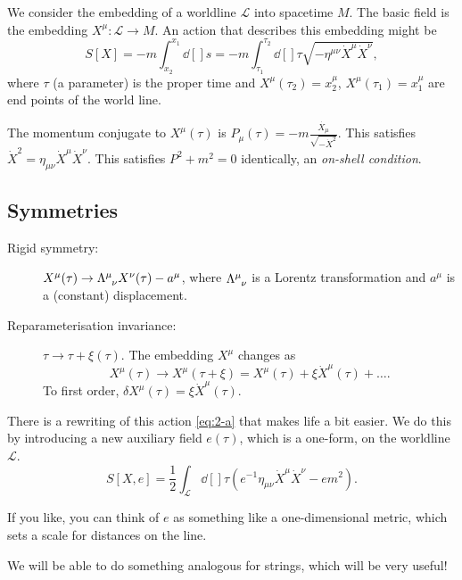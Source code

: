 We consider the embedding of a worldline $\mathcal{L}$  into spacetime $M$.
The basic field is the embedding  $X^{\mu} \colon \mathcal{L} \to M$. An action that describes this embedding might be
\begin{equation}
  \label{eq:2-a}
  S[X] = -m \int_{x_2}^{x_1} \dd[]{s} = -m \int_{\tau_1}^{\tau_2} \dd[]{\tau} \sqrt{-\eta^{\mu\nu} \dot{X}^{\mu} \dot{X}^{\nu}},
\end{equation}
where $\tau$ (a parameter) is the proper time and $X^{\mu}(\tau_2) = x_2^{\mu}$, $X^{\mu}(\tau_1) = x_1^{\mu}$ are end points of the world line.
\begin{figure}[tbhp]
  \centering
  \def\svgwidth{0.4\columnwidth}
  
  \caption{}
  \label{fig:l2f1}
\end{figure}

The momentum conjugate to $X^{\mu}(\tau)$  is $P_{\mu}(\tau) = - m \frac{\dot{X_{\mu}}}{\sqrt{- \dot{X}^2}}$. This satisfies $\dot{X}^2 = \eta_{\mu\nu} \dot{X}^{\mu} \dot{X}^{\nu}$. 
This satisfies $P^2 + m^2 = 0$ identically, an \emph{on-shell condition}.

\subsection*{Symmetries}%

\begin{description}
  \item[Rigid symmetry:] $X^{\mu}(\tau) \to \Lambda\indices{^{\mu}_{\nu}} X^{\nu}(\tau) - a^{\mu}$, where $\Lambda\indices{^{\mu}_{\nu}}$ is a Lorentz transformation and $a^{\mu}$ is a (constant) displacement.
  \item[Reparameterisation invariance:] $\tau \to \tau + \xi(\tau)$. The embedding $X^{\mu}$ changes as 
    \begin{equation}
      X^{\mu}(\tau) \to X^{\mu}(\tau + \xi) = X^{\mu}(\tau) + \xi \dot{X}^{\mu}(\tau) + \dots.
    \end{equation}
    To first order, $\delta X^{\mu}(\tau) = \xi \dot{X}^{\mu} (\tau)$.
\end{description}

There is a rewriting of this action \eqref{eq:2-a} that makes life a bit easier.
We do this by introducing a new auxiliary field $e(\tau)$, which is a one-form, on the worldline $\mathcal{L}$.
\begin{equation}
  \label{eq:2-b}
  S[X, e] = \frac{1}{2} \int_{\mathcal{L}} \dd[]{\tau} \left( e^{-1} \eta_{\mu\nu} \dot{X}^{\mu} \dot{X}^{\nu} - em^2 \right).
\end{equation}
\begin{leftbar}
  If you like, you can think of $e$ as something like a one-dimensional metric, which sets a scale for distances on the line.
\end{leftbar}
\begin{leftbar}
  We will be able to do something analogous for strings, which will be very useful!
\end{leftbar}

